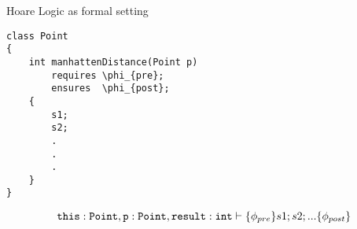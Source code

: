 

Hoare Logic as formal setting

\begin{verbatim}
class Point
{
    int manhattenDistance(Point p)
        requires \phi_{pre};
        ensures  \phi_{post};
    {
        s1;
        s2;
        .
        .
        .
    }
}
\end{verbatim}

\begin{displaymath}
{\texttt{this}: \texttt{Point}, \texttt{p} : \texttt{Point}, \texttt{result}: \texttt{int}} \vdash \{{\phi_{pre}}\} {s1; s2; ...} \{{\phi_{post}}\}
\end{displaymath}